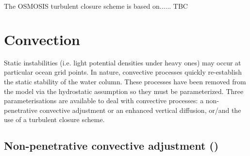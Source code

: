 \documentclass[../tex_main/NEMO_manual]{subfiles}
\begin{document}


The OSMOSIS turbulent closure scheme is based on......   TBC

\section{Convection}
\label{sec:ZDF_conv}



Static instabilities (i.e. light potential densities under heavy ones) may 
occur at particular ocean grid points. In nature, convective processes 
quickly re-establish the static stability of the water column. These 
processes have been removed from the model via the hydrostatic 
assumption so they must be parameterized. Three parameterisations 
are available to deal with convective processes: a non-penetrative 
convective adjustment or an enhanced vertical diffusion, or/and the 
use of a turbulent closure scheme.

\subsection[Non-penetrative convective adjmt (\protect\np{ln\_tranpc}\forcode{ = .true.})]
				{Non-penetrative convective adjustment (\protect{})}
\label{subsec:ZDF_npc}


\end{document}
